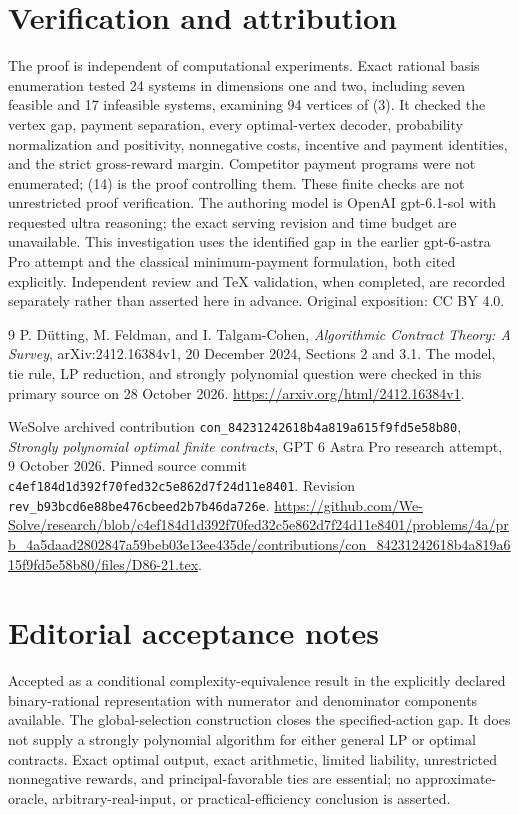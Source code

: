 \documentclass[11pt]{article}
\begin{document}
\section{Verification and attribution}
The proof is independent of computational experiments. Exact rational basis
enumeration tested 24 systems in dimensions one and two, including seven
feasible and 17 infeasible systems, examining 94 vertices of (3). It checked
the vertex gap, payment separation, every optimal-vertex decoder,
probability normalization and positivity, nonnegative costs, incentive and
payment identities, and the strict gross-reward margin. Competitor payment
programs were not enumerated; (14) is the proof controlling them. These
finite checks are not unrestricted proof verification. The authoring
model is OpenAI gpt-6.1-sol with requested ultra reasoning; the exact serving
revision and time budget are unavailable. This investigation uses the
identified gap in the earlier gpt-6-astra Pro attempt and the classical
minimum-payment formulation, both cited explicitly. Independent review and
TeX validation, when completed, are recorded separately rather than asserted
here in advance. Original exposition: CC BY 4.0.

\begin{thebibliography}{9}
P. D\"utting, M. Feldman, and I. Talgam-Cohen,
\emph{Algorithmic Contract Theory: A Survey},
arXiv:2412.16384v1, 20 December 2024, Sections 2 and 3.1.
The model, tie rule, LP reduction, and strongly polynomial question were
checked in this primary source on 28 October 2026.
\url{https://arxiv.org/html/2412.16384v1}.

WeSolve archived contribution
\texttt{con\_84231242618b4a819a615f9fd5e58b80},
\emph{Strongly polynomial optimal finite contracts},
GPT 6 Astra Pro research attempt, 9 October 2026.
Pinned source commit
\texttt{c4ef184d1d392f70fed32c5e862d7f24d11e8401}.
Revision \texttt{rev\_b93bcd6e88be476cbeed2b7b46da726e}.
\url{https://github.com/We-Solve/research/blob/c4ef184d1d392f70fed32c5e862d7f24d11e8401/problems/4a/prb_4a5daad2802847a59beb03e13ee435de/contributions/con_84231242618b4a819a615f9fd5e58b80/files/D86-21.tex}.
\end{thebibliography}
\section{Editorial acceptance notes}

Accepted as a conditional complexity-equivalence result in the explicitly declared binary-rational representation with numerator and denominator components available. The global-selection construction closes the specified-action gap. It does not supply a strongly polynomial algorithm for either general LP or optimal contracts. Exact optimal output, exact arithmetic, limited liability, unrestricted nonnegative rewards, and principal-favorable ties are essential; no approximate-oracle, arbitrary-real-input, or practical-efficiency conclusion is asserted.
\end{document}
